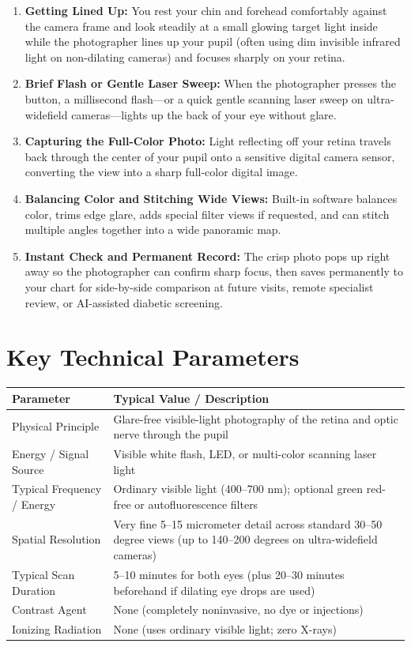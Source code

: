 \begin{enumerate}
    \item \textbf{Getting Lined Up:} You rest your chin and forehead comfortably against the camera frame and look steadily at a small glowing target light inside while the photographer lines up your pupil (often using dim invisible infrared light on non-dilating cameras) and focuses sharply on your retina.
    \item \textbf{Brief Flash or Gentle Laser Sweep:} When the photographer presses the button, a millisecond flash---or a quick gentle scanning laser sweep on ultra-widefield cameras---lights up the back of your eye without glare.
    \item \textbf{Capturing the Full-Color Photo:} Light reflecting off your retina travels back through the center of your pupil onto a sensitive digital camera sensor, converting the view into a sharp full-color digital image.
    \item \textbf{Balancing Color and Stitching Wide Views:} Built-in software balances color, trims edge glare, adds special filter views if requested, and can stitch multiple angles together into a wide panoramic map.
    \item \textbf{Instant Check and Permanent Record:} The crisp photo pops up right away so the photographer can confirm sharp focus, then saves permanently to your chart for side-by-side comparison at future visits, remote specialist review, or AI-assisted diabetic screening.
\end{enumerate}

\section{Key Technical Parameters}

\noindent\begin{tabularx}{\textwidth}{@{}l X@{}}
\toprule
\textbf{Parameter} & \textbf{Typical Value / Description} \\
\midrule
Physical Principle & Glare-free visible-light photography of the retina and optic nerve through the pupil \\
Energy / Signal Source & Visible white flash, LED, or multi-color scanning laser light \\
Typical Frequency / Energy & Ordinary visible light (400--700 nm); optional green red-free or autofluorescence filters \\
Spatial Resolution & Very fine 5--15 micrometer detail across standard 30--50 degree views (up to 140--200 degrees on ultra-widefield cameras) \\
Typical Scan Duration & 5--10 minutes for both eyes (plus 20--30 minutes beforehand if dilating eye drops are used) \\
Contrast Agent & None (completely noninvasive, no dye or injections) \\
Ionizing Radiation & None (uses ordinary visible light; zero X-rays) \\
\bottomrule
\end{tabularx}

